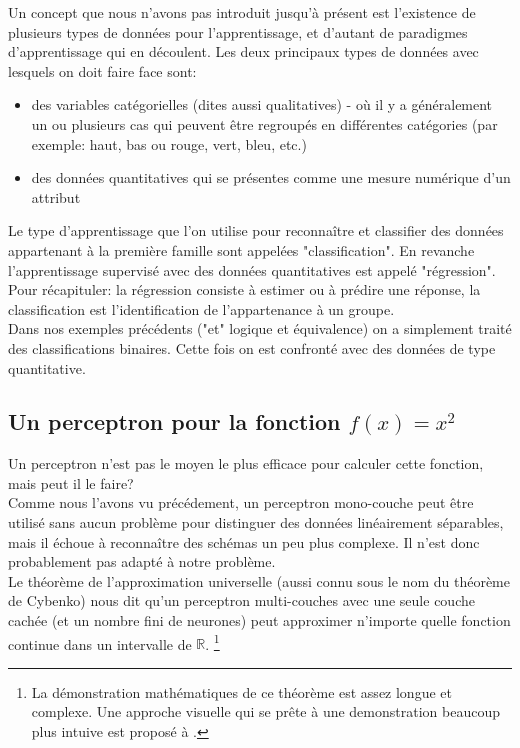 \documentclass[twoside,openright,a4paper,11pt,french]{article}
\begin{document}
Un concept que nous n'avons pas introduit jusqu'à présent est l'existence de plusieurs
types de données pour l'apprentissage, et d'autant de paradigmes d'apprentissage qui en
découlent. Les deux principaux types de données avec lesquels on doit faire
face sont:

\begin{itemize}
\item des variables catégorielles (dites aussi qualitatives) - où il y a généralement
      un ou plusieurs cas qui peuvent être regroupés en différentes catégories 
     (par exemple: haut, bas ou rouge, vert, bleu, etc.)
\item des données quantitatives qui se présentes comme une mesure numérique d'un attribut
\end{itemize}

Le type d'apprentissage que l'on utilise pour reconnaître et classifier des
données appartenant à la première famille sont appelées "classification". 
En revanche l'apprentissage supervisé avec des données quantitatives est appelé
"régression".\cite{kindsNN}\\

Pour récapituler: la régression consiste à estimer ou à prédire une réponse,
la classification est l'identification de l'appartenance à un groupe.\\

Dans nos exemples précédents ("et" logique et équivalence) on a simplement
traité des classifications binaires. Cette fois on est confronté avec des données
de type quantitative.


\subsection{Un perceptron pour la fonction $f(x) = x^2$}
Un perceptron n'est pas le moyen le plus efficace pour calculer cette 
fonction, mais peut il le faire?\\

Comme nous l'avons vu précédement, un perceptron mono-couche peut être utilisé sans aucun
problème pour distinguer des données linéairement séparables, mais il échoue 
à reconnaître des schémas un peu plus complexe. Il n'est donc 
probablement pas adapté à notre problème.\\

Le théorème de l'approximation universelle (aussi connu sous le nom du théorème de Cybenko) 
nous dit qu'un perceptron multi-couches avec une seule couche cachée (et un nombre
fini de neurones) peut approximer n'importe quelle fonction continue dans un 
intervalle de $\mathbb{R}$.
\footnote{
La démonstration mathématiques de ce théorème est assez longue et complexe. Une approche visuelle
qui se prête à une demonstration beaucoup plus intuive est proposé à \cite{visuniprof}.
}
\cite{cybthm}
\end{document}

